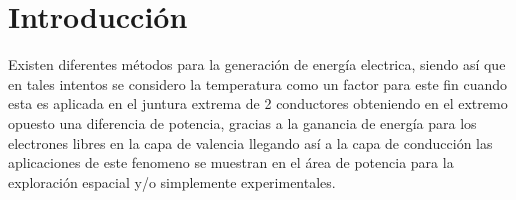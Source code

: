 \section*{Introducción}

Existen diferentes métodos para la generación de energía electrica, siendo así que en tales intentos se considero la temperatura como un factor para este fin cuando esta es aplicada en el juntura extrema de 2 conductores obteniendo en el extremo opuesto una diferencia de potencia, gracias a la ganancia de energía para los electrones libres en la capa de valencia llegando así a la capa de conducción las aplicaciones de este fenomeno se muestran en el área de potencia para la exploración espacial y/o simplemente experimentales.
